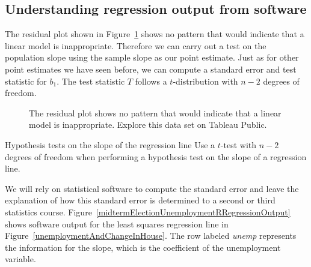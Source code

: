 \D{\newpage}

\subsection{Understanding regression output from software}
\label{testStatisticForTheSlope}

The residual plot shown in Figure~\ref{unemploymentAndChangeInHouseResiduals} shows no pattern that would indicate that a linear model is inappropriate.  Therefore we can carry out a test on the population slope using the sample slope as our point estimate.  Just as for other point estimates we have seen before, we can compute a standard error and test statistic for $b_1$. The test statistic $T$ follows a $t$-distribution with $n-2$ degrees of freedom.

\begin{figure}[h]
\centering
{}
\caption{The residual plot shows no pattern that would indicate that a linear model is inappropriate.  Explore this data set on Tableau Public.}
\label{unemploymentAndChangeInHouseResiduals}
\end{figure}

\begin{onebox}{Hypothesis tests on the slope of the regression line}
Use a $t$-test with $n - 2$ degrees of freedom when performing a hypothesis test on the slope of a regression line.\end{onebox}


We will rely on statistical software to compute the standard error and leave the explanation of how this standard error is determined to a second or third statistics course.
Figure~\ref{midtermElectionUnemploymentRRegressionOutput} shows software output for the least squares regression line in Figure~\ref{unemploymentAndChangeInHouse}. The row labeled \emph{unemp} represents the information for the slope, which is the coefficient of the unemployment variable.


